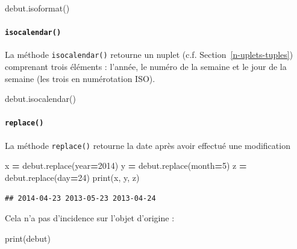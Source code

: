 \documentclass[12pt,]{book}
\newenvironment{Shaded}{\begin{snugshade}}{\end{snugshade}}
\newcommand{\DecValTok}[1]{\textcolor[rgb]{0.00,0.00,0.81}{#1}}
\newcommand{\OperatorTok}[1]{\textcolor[rgb]{0.81,0.36,0.00}{\textbf{#1}}}
\newcommand{\BuiltInTok}[1]{#1}
\newcommand{\NormalTok}[1]{#1}
\let\oldparagraph\paragraph
\renewcommand{\paragraph}[1]{\oldparagraph{#1}\mbox{}}
\numberwithin{equation}{section}
\numberwithin{countremarque}{section}
\begin{document}
\begin{Shaded}
\begin{Highlighting}[]
\NormalTok{debut.isoformat()}
\end{Highlighting}
\end{Shaded}

\paragraph{\texorpdfstring{\texttt{isocalendar()}}{isocalendar()}}\label{isocalendar}

La méthode \texttt{isocalendar()} retourne un nuplet (c.f.
Section~\ref{n-uplets-tuples}) comprenant trois éléments : l'année, le
numéro de la semaine et le jour de la semaine (les trois en numérotation
ISO).

\begin{Shaded}
\begin{Highlighting}[]
\NormalTok{debut.isocalendar()}
\end{Highlighting}
\end{Shaded}

\paragraph{\texorpdfstring{\texttt{replace()}}{replace()}}\label{replace}

La méthode \texttt{replace()} retourne la date après avoir effectué une
modification

\begin{Shaded}
\begin{Highlighting}[]
\NormalTok{x }\OperatorTok{=}\NormalTok{ debut.replace(year}\OperatorTok{=}\DecValTok{2014}\NormalTok{)}
\NormalTok{y }\OperatorTok{=}\NormalTok{ debut.replace(month}\OperatorTok{=}\DecValTok{5}\NormalTok{)}
\NormalTok{z }\OperatorTok{=}\NormalTok{ debut.replace(day}\OperatorTok{=}\DecValTok{24}\NormalTok{)}
\BuiltInTok{print}\NormalTok{(x, y, z)}
\end{Highlighting}
\end{Shaded}

\begin{lstlisting}
## 2014-04-23 2013-05-23 2013-04-24
\end{lstlisting}

Cela n'a pas d'incidence sur l'objet d'origine :

\begin{Shaded}
\begin{Highlighting}[]
\BuiltInTok{print}\NormalTok{(debut)}
\end{Highlighting}
\end{Shaded}
\end{document}
